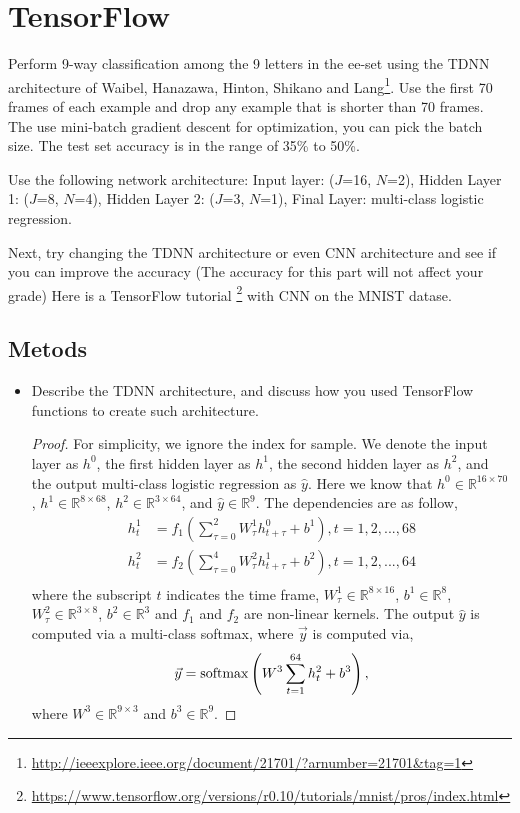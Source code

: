 \documentclass[11pt]{article}
\newcommand{\R}{\mathbb{R}}
\newcommand{\1}{\mathbf{1}}
\begin{document}
{\section{TensorFlow}
Perform 9-way classification among the 9 letters in the ee-set using the TDNN architecture of Waibel, Hanazawa, Hinton, Shikano and Lang\footnote{\url{http://ieeexplore.ieee.org/document/21701/?arnumber=21701&tag=1}}. Use the first 70 frames of each example and drop any example that is shorter than 70 frames. The use mini-batch gradient descent for optimization, you can pick the batch size. The test set accuracy is in the range of 35\% to 50\%.

Use the following network architecture:
Input layer: ($J$=16, $N$=2), Hidden Layer 1: ($J$=8, $N$=4), Hidden Layer 2: ($J$=3, $N$=1), Final Layer: multi-class logistic regression.

Next, try changing the TDNN architecture or even CNN architecture and see if you can improve the accuracy (The accuracy for this part will not affect your grade) Here is a TensorFlow tutorial
\footnote{\url{https://www.tensorflow.org/versions/r0.10/tutorials/mnist/pros/index.html}} with CNN on the MNIST datase.

\subsection{Metods}
\begin{itemize}
  \item Describe the TDNN architecture, and discuss how you used TensorFlow functions to create such architecture.
      \begin{proof}
        For simplicity, we ignore the index for sample. We denote the input layer as $h^0$, the first hidden layer as $h^1$, the second hidden layer as $h^2$, and the output multi-class logistic regression as $\hat{y}$. Here we know that $h^0 \in \R^{16\times 70}$, $h^1 \in \R^{8\times 68}$, $h^2 \in \R^{3 \times 64}$, and $\hat{y} \in \R^9$. The dependencies are as follow,
        \begin{align}
          h^1_t &= f_1\left(\sum_{\tau = 0}^2 W^1_\tau h^0_{t+\tau} + b^1\right), t=1,2,...,68 \label{eq:hidden1}\\
          h^2_t &= f_2\left(\sum_{\tau = 0}^4 W^2_\tau h^1_{t+\tau} + b^2\right), t=1,2,...,64 \label{eq:hidden2}\\
        \end{align}
        where the subscript $t$ indicates the time frame,  $W^1_{\tau} \in \R^{8\times 16}$, $b^1 \in \R^8$,  $W^2_{\tau} \in \R^{3\times 8}$, $b^2 \in \R^3$ and $f_1$ and $f_2$ are non-linear kernels. The output $\hat{y}$ is computed via a multi-class softmax, where $\vec{y}$ is computed via,
        \begin{align}
          \vec{y} = {\rm softmax}\left(W^3 \sum_{t=1}^{64} h_t^2 + b^3\right), \label{eq:output}
        \end{align}
        where $W^3 \in \R^{9\times 3}$ and $b^3 \in \R^9$.


\end{proof}
\end{itemize}}
\end{document}
